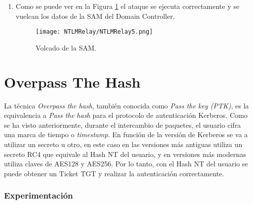 \begin{enumerate}
\item Como se puede ver en la Figura \ref{NTLMRelay5} el ataque se ejecuta correctamente y se vuelcan los datos de la SAM del Domain Controller. 
\begin{figure}[H] %
\begin{center}
\texttt{[image: NTLMRelay/NTLMRelay5.png]}
\end{center}
\caption{Volcado de la SAM.}
\label{NTLMRelay5}
\end{figure}

\end{enumerate}

\section{Overpass The Hash}

La técnica {\it Overpass the hash}, también conocida como {\it Pass the key (PTK)}, es la equivalencia a {\it Pass the hash} para el protocolo de autenticación Kerberos. Como se ha visto anteriormente, durante el intercambio de paquetes, el usuario cifra una marca de tiempo o {\it timestamp}. En función de la versión de Kerberos se va a utilizar un secreto u otro, en este caso en las versiones más antiguas utiliza un secreto RC4 que equivale al Hash NT del usuario, y en versiones más modernas utiliza claves de AES128 y AES256. Por lo tanto, con el Hash NT del usuario se puede obtener un Ticket TGT y  realizar la autenticación correctamente.

\subsubsection{Experimentación}


